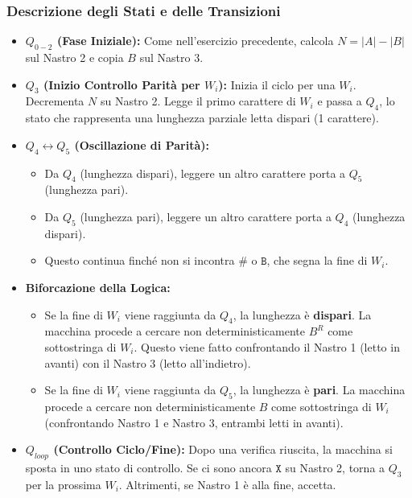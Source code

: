 \documentclass[a4paper]{article}
\newcommand{\B}{\texttt{B}} %
\newcommand{\Sh}{\texttt{\#}} %
\newcommand{\X}{\texttt{X}} %
\begin{document}
\subsubsection{Descrizione degli Stati e delle Transizioni}
\begin{itemize}
    \item \textbf{$Q_{0-2}$ (Fase Iniziale):} Come nell'esercizio precedente, calcola $N=|A|-|B|$ sul Nastro 2 e copia $B$ sul Nastro 3.
    \item \textbf{$Q_3$ (Inizio Controllo Parità per $W_i$):} Inizia il ciclo per una $W_i$. Decrementa $N$ su Nastro 2. Legge il primo carattere di $W_i$ e passa a $Q_4$, lo stato che rappresenta una lunghezza parziale letta dispari (1 carattere).
    \item \textbf{$Q_4 \leftrightarrow Q_5$ (Oscillazione di Parità):}
        \begin{itemize}
            \item Da $Q_4$ (lunghezza dispari), leggere un altro carattere porta a $Q_5$ (lunghezza pari).
            \item Da $Q_5$ (lunghezza pari), leggere un altro carattere porta a $Q_4$ (lunghezza dispari).
            \item Questo continua finché non si incontra $\Sh$ o $\B$, che segna la fine di $W_i$.
        \end{itemize}
    \item \textbf{Biforcazione della Logica:}
        \begin{itemize}
            \item Se la fine di $W_i$ viene raggiunta da $Q_4$, la lunghezza è \textbf{dispari}. La macchina procede a cercare non deterministicamente $B^R$ come sottostringa di $W_i$. Questo viene fatto confrontando il Nastro 1 (letto in avanti) con il Nastro 3 (letto all'indietro).
            \item Se la fine di $W_i$ viene raggiunta da $Q_5$, la lunghezza è \textbf{pari}. La macchina procede a cercare non deterministicamente $B$ come sottostringa di $W_i$ (confrontando Nastro 1 e Nastro 3, entrambi letti in avanti).
        \end{itemize}
    \item \textbf{$Q_{loop}$ (Controllo Ciclo/Fine):} Dopo una verifica riuscita, la macchina si sposta in uno stato di controllo. Se ci sono ancora $\X$ su Nastro 2, torna a $Q_3$ per la prossima $W_i$. Altrimenti, se Nastro 1 è alla fine, accetta.
\end{itemize}
\end{document}
